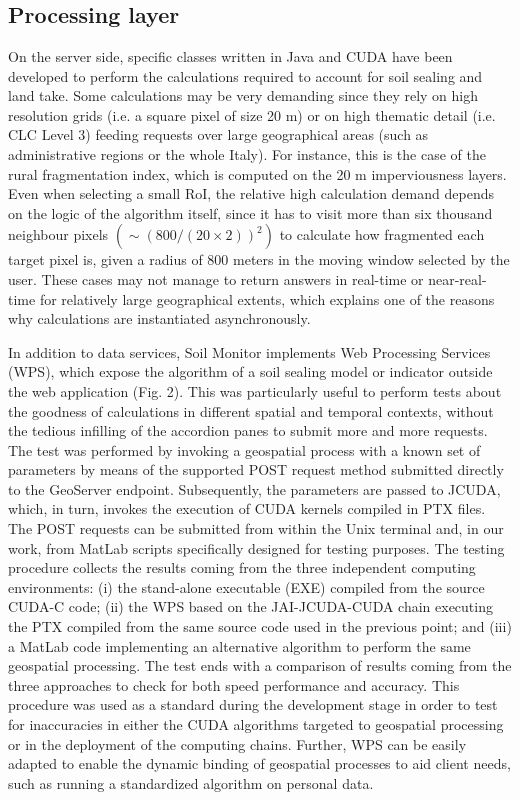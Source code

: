\documentclass[APA,LATO1COL,doublespace]{WileyNJD-v2}
\begin{document}
\section{  }
\subsection{Processing layer}
On the server side, specific classes written in Java and CUDA have been developed to perform the calculations required to account for soil sealing and land take. 
Some calculations may be very demanding since they rely on high resolution grids (i.e. a square pixel of size 20 m) or on high thematic detail (i.e. CLC Level 3) feeding requests over large geographical areas (such as administrative regions or the whole Italy). For instance, this is the case of the rural fragmentation index, which is computed on the 20 m imperviousness layers. 
Even when selecting a small RoI, the relative high calculation demand depends on the logic of the algorithm itself, since it has to visit more than six thousand neighbour pixels $\left( \sim ( 800/\left(20\times2\right) )^2 \right)$ to calculate how fragmented each target pixel is, given a radius of 800 meters in the moving window selected by the user.
These cases may not manage to return answers in real-time or near-real-time for relatively large geographical extents, which explains one of the reasons why calculations are instantiated asynchronously.

In addition to data services, Soil Monitor implements Web Processing Services (WPS), which expose the algorithm of a soil sealing model or indicator outside the web application (Fig. 2). 
This was particularly useful to perform tests about the goodness of calculations in different spatial and temporal contexts, without the tedious infilling of the accordion panes to submit more and more requests. 
The test was performed by invoking a geospatial process with a known set of parameters by means of the supported POST request method submitted directly to the GeoServer endpoint. 
Subsequently, the parameters are passed to JCUDA, which, in turn, invokes the execution of CUDA kernels compiled in PTX files. 
The POST requests can be submitted from within the Unix terminal and, in our work, from MatLab scripts specifically designed for testing purposes. 
The testing procedure collects the results coming from the three independent computing environments: 
(i) the stand-alone executable (EXE) compiled from the source CUDA-C code; 
(ii) the WPS based on the JAI-JCUDA-CUDA chain executing the PTX compiled from the same source code used in the previous point; and 
(iii) a MatLab code implementing an alternative algorithm to perform the same geospatial processing. 
The test ends with a comparison of results coming from the three approaches to check for both speed performance and accuracy. 
This procedure was used as a standard during the development stage in order to test for inaccuracies in either the CUDA algorithms targeted to geospatial processing or in the deployment of the computing chains.
Further, WPS can be easily adapted to enable the dynamic binding of geospatial processes to aid client needs, such as running a standardized algorithm on personal data.
\end{document}
